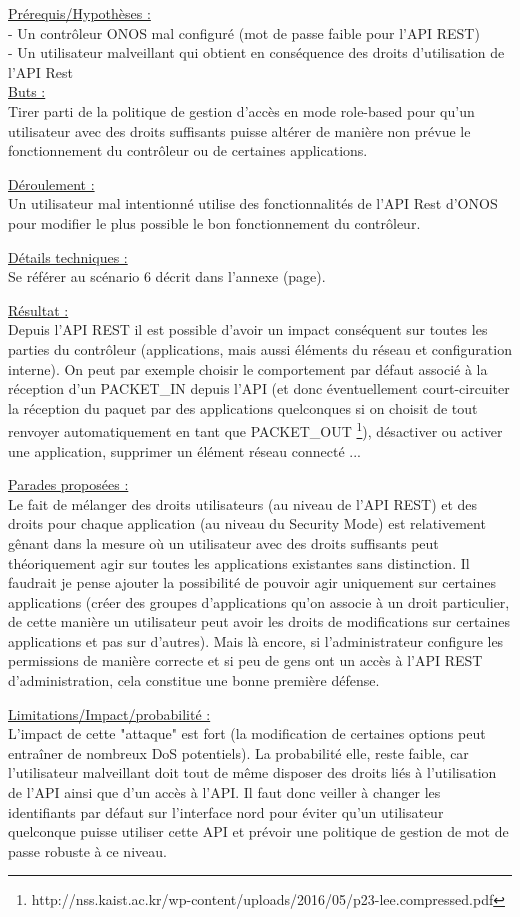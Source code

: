 \underline{Prérequis/Hypothèses :}\\
- Un contrôleur ONOS mal configuré (mot de passe faible pour l'API REST)\\
- Un utilisateur malveillant qui obtient en conséquence des droits d’utilisation de l’API Rest\\


\underline{Buts :}\\
Tirer parti de la politique de gestion d’accès en mode role-based pour qu’un utilisateur avec des droits suffisants puisse altérer de manière non prévue le fonctionnement du contrôleur ou de certaines applications.

\underline{Déroulement :}\\
Un utilisateur mal intentionné utilise des fonctionnalités de l’API Rest d’ONOS pour modifier le plus possible le bon fonctionnement du contrôleur.

\underline{Détails techniques :}\\
Se référer au scénario 6 décrit dans l'annexe (page).

\underline{Résultat :}\\
Depuis l'API REST il est possible d'avoir un impact conséquent sur toutes les parties du contrôleur (applications, mais aussi éléments du réseau et configuration interne). On peut par exemple choisir le comportement par défaut associé à la réception d'un PACKET\_IN depuis l'API (et donc éventuellement court-circuiter la réception du paquet par des applications quelconques si on choisit de tout renvoyer automatiquement en tant que PACKET\_OUT \footnote{\label{ONOS_REST}http://nss.kaist.ac.kr/wp-content/uploads/2016/05/p23-lee.compressed.pdf}), désactiver ou activer une application, supprimer un élément réseau connecté ...

\underline{Parades proposées :}\\
Le fait de mélanger des droits utilisateurs (au niveau de l'API REST) et des droits pour chaque application (au niveau du Security Mode) est relativement gênant dans la mesure où un utilisateur avec des droits suffisants peut théoriquement agir sur toutes les applications existantes sans distinction. Il faudrait je pense ajouter la possibilité de pouvoir agir uniquement sur certaines applications (créer des groupes d’applications qu’on associe à un droit particulier, de cette manière un utilisateur peut avoir les droits de modifications sur certaines applications et pas sur d’autres). Mais là encore, si l'administrateur configure les permissions de manière correcte et si peu de gens ont un accès à l'API REST d'administration, cela constitue une bonne première défense.

\underline{Limitations/Impact/probabilité :}\\
L’impact de cette "attaque" est fort (la modification de certaines options peut entraîner de nombreux DoS potentiels). La probabilité elle, reste faible, car l’utilisateur malveillant doit tout de même disposer des droits liés à l’utilisation de l’API ainsi que d’un accès à l’API. Il faut donc veiller à changer les identifiants par défaut sur l’interface nord pour éviter qu’un utilisateur quelconque puisse utiliser cette API et prévoir une politique de gestion de mot de passe robuste à ce niveau.